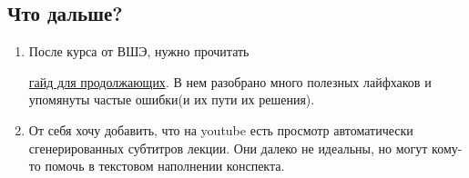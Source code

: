 \subsection{Что дальше?}
\begin{enumerate}
    \item После курса от ВШЭ, нужно прочитать
    
    \href{https://drive.google.com/file/d/1ItSd7wIKDC0uJiJ-Hifd1JO3MKASVVKl/view?usp=sharing}{гайд для продолжающих}. 
    В нем разобрано много полезных лайфхаков и упомянуты частые ошибки(и их пути их решения). 
    
    \item От себя хочу добавить, что на youtube есть просмотр автоматически сгенерированных субтитров лекции. 
    Они далеко не идеальны, но могут кому-то помочь в текстовом наполнении конспекта.

\end{enumerate}
